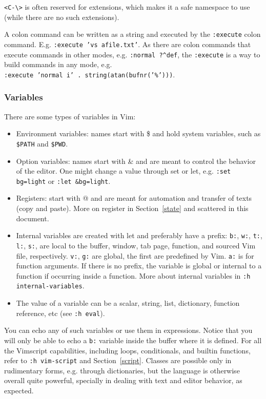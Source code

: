 \documentclass{article}
\newcommand{\ttt}[1] {
	\texttt{<#1>}}
\newcommand{\tttt}[1]{\texttt{#1}}
\begin{document}
\ttt{C-\textbackslash} is often reserved for extensions,
which makes it a safe namespace to use (while there are no
such extensions).

A colon command can be written as a string
and executed by the \tttt{:execute} colon command.
E.g. \tttt{:execute 'vs afile.txt'}.
As there are colon commands that execute commands in other
modes, e.g. \tttt{:normal ?\textasciicircum def},
the \tttt{:execute} is a way to build commands in any mode,
e.g.
\\\tttt{:execute 'normal i' . string(atan(bufnr('\%')))}.


\subsubsection{Variables}
There are some types of variables in Vim:
\begin{itemize}
	\item Environment variables: names start with \$ and hold system
		variables, such as \tttt{\$PATH} and \tttt{\$PWD}.
	\item Option variables: names start with \& and are meant to control the behavior of the editor.
		One might change a value through set or let, e.g.
		\tttt{:set bg=light} or \tttt{:let \&bg=light}.
	\item Registers: start with @ and are meant for automation and transfer of texts (copy and paste).
    More on register in Section~\ref{state} and scattered in this
    document.
	\item Internal variables are created with let and preferably have a prefix:
	\tttt{b:}, \tttt{w:}, \tttt{t:}, \tttt{l:}, \tttt{s:},
		are local to the buffer, window, tab page, function, and
		sourced Vim file, respectively.
 \tttt{v:}, \tttt{g:} are global, the first are predefined by Vim.
		\tttt{a:} is for function arguments.
		If there is no prefix, the variable is global or internal to a function if occurring inside a function.
		More about internal variables in \tttt{:h internal-variables}.
	\item The value of a variable can be a scalar, string, list, dictionary, function reference, etc (see \tttt{:h eval}).
\end{itemize}
You can echo any of such variables or use them in expressions.
Notice that you will only be able to echo a \tttt{b:} variable inside
the buffer where it is defined.
For all the Vimscript capabilities, including loops, conditionals,
and builtin functions, refer to \tttt{:h vim-script} and Section~\ref{script}.
Classes are possible only in rudimentary forms, e.g. through dictionaries,
but the language is otherwise overall quite powerful,
specially in dealing with text and editor behavior, as expected.
\end{document}
